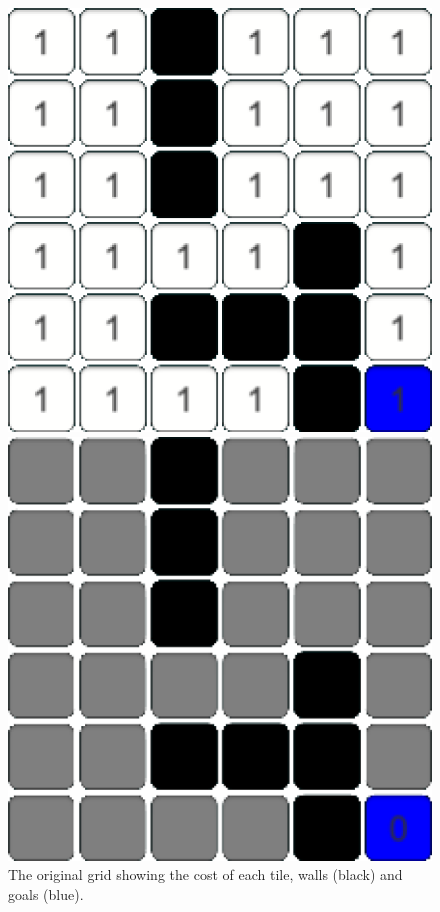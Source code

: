 \documentclass[conference]{IEEEtran}
\begin{document}
\begin{figure}[h]
\centering
\begin{minipage}[t]{0.3\linewidth}
\centering
\includegraphics[width=1\textwidth]{images/intro/original.png}
\caption{The original grid showing the cost of each tile, walls (black) and goals (blue).}
\end{minipage}
\hfill
\begin{minipage}[t]{0.3\linewidth}
\centering
\includegraphics[width=1\textwidth]{images/intro/init.png}

\end{minipage}
\end{figure}
\end{document}
